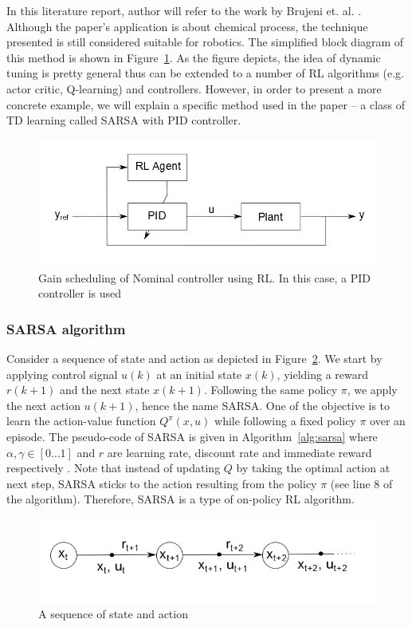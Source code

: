 In this literature report, author will refer to the work by Brujeni et. al. \cite{Brujeni5669655}. Although the paper's application is about chemical process, the technique presented is still considered suitable for robotics. The simplified block diagram of this method is shown in Figure~\ref{fig:dynamictuning}. As the figure depicts, the idea of dynamic tuning is pretty general thus can be extended to a number of \ac {RL} algorithms (e.g. actor critic, Q-learning) and controllers. However, in order to present a more concrete example, we will explain a specific method used in the paper -- a class of \ac {TD} learning called \ac{SARSA} with \ac{PID} controller. 

\begin{figure}[h!]
	\centering
	\includegraphics[width=0.7\linewidth]{dynamictuning}
	\caption{Gain scheduling of Nominal controller using \ac {RL}. In this case, a \ac{PID} controller is used}
	\label{fig:dynamictuning}
\end{figure}

	\subsubsection{\ac{SARSA} algorithm} 
	Consider a sequence of state and action as depicted in Figure~\ref{fig:sarsa}. We start by applying control signal $ u(k) $ at an initial state $ x(k) $, yielding a reward $ r(k+1) $ and the next state $ x(k+1)$. Following the same policy $\pi$, we apply the next action $ u(k+1) $, hence the name \ac {SARSA}. One of the objective is to learn the action-value function $ Q^{\pi}(x,u) $ while following a fixed policy $ \pi $ over an episode. The pseudo-code of \ac{SARSA} is given in Algorithm~\ref{alg:sarsa} where $ \alpha, \gamma \in [0 \dots 1]$ and $r$ are learning rate, discount rate and immediate reward respectively \cite{sutton1998reinforcement}. Note that instead of updating $Q$ by taking the optimal action at next step, \ac {SARSA} sticks to the action resulting from the policy $\pi$ (see line 8 of the algorithm). Therefore, \ac {SARSA} is a type of on-policy \ac {RL} algorithm.
	
	
	\begin{figure}[h!]
		\centering
		\includegraphics[width=0.7\linewidth]{sarsa}
		\caption{A sequence of state and action}
		\label{fig:sarsa}
	\end{figure}
	
